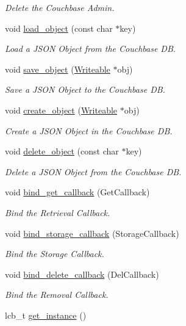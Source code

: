 \begin{DoxyCompactItemize}
\begin{DoxyCompactList}\small\item\em Delete the Couchbase Admin. \end{DoxyCompactList}\item 
void \hyperlink{classCouchbaseAdmin_afc05e9ffcd5fa9dd557cbd452b1d91db}{load\-\_\-object} (const char $\ast$key)
\begin{DoxyCompactList}\small\item\em Load a J\-S\-O\-N Object from the Couchbase D\-B. \end{DoxyCompactList}\item 
void \hyperlink{classCouchbaseAdmin_a88a4592398aba43761a3a43873f012db}{save\-\_\-object} (\hyperlink{classWriteable}{Writeable} $\ast$obj)
\begin{DoxyCompactList}\small\item\em Save a J\-S\-O\-N Object to the Couchbase D\-B. \end{DoxyCompactList}\item 
void \hyperlink{classCouchbaseAdmin_af2a2f49b4085db2493c6c72db9143060}{create\-\_\-object} (\hyperlink{classWriteable}{Writeable} $\ast$obj)
\begin{DoxyCompactList}\small\item\em Create a J\-S\-O\-N Object in the Couchbase D\-B. \end{DoxyCompactList}\item 
void \hyperlink{classCouchbaseAdmin_a7304d9e45d68415042e8f097a90d39f1}{delete\-\_\-object} (const char $\ast$key)
\begin{DoxyCompactList}\small\item\em Delete a J\-S\-O\-N Object from the Couchbase D\-B. \end{DoxyCompactList}\item 
void \hyperlink{classCouchbaseAdmin_a5ee5a510733d51a72df3d3e64419e35a}{bind\-\_\-get\-\_\-callback} (Get\-Callback)
\begin{DoxyCompactList}\small\item\em Bind the Retrieval Callback. \end{DoxyCompactList}\item 
void \hyperlink{classCouchbaseAdmin_a38ab8dcaa03d56c822705560e39bf199}{bind\-\_\-storage\-\_\-callback} (Storage\-Callback)
\begin{DoxyCompactList}\small\item\em Bind the Storage Callback. \end{DoxyCompactList}\item 
void \hyperlink{classCouchbaseAdmin_a4effd1e925f32d2a1bb08401ab14ad07}{bind\-\_\-delete\-\_\-callback} (Del\-Callback)
\begin{DoxyCompactList}\small\item\em Bind the Removal Callback. \end{DoxyCompactList}\item 
\hypertarget{classCouchbaseAdmin_ad5f13695bc2ff678699a7afc9122d043}{lcb\-\_\-t \hyperlink{classCouchbaseAdmin_ad5f13695bc2ff678699a7afc9122d043}{get\-\_\-instance} ()}\label{classCouchbaseAdmin_ad5f13695bc2ff678699a7afc9122d043}


\end{DoxyCompactItemize}
